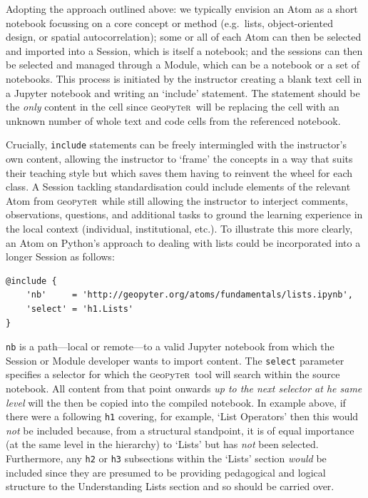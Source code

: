 \documentclass[letter, 11pt,titlepage]{article}
\newcommand{\gp}{\textsc{g}eo\textsc{p}y\textsc{t}e\textsc{r}~\/}
\newcommand{\eg}{e.g.~\/}
\begin{document}
Adopting the approach outlined above: we typically envision an Atom as a short notebook focussing on a core concept or method (\eg lists, object-oriented design, or spatial autocorrelation); some or all of each Atom can then be selected and imported into a Session, which is itself a notebook; and the sessions can then be selected and managed through a Module, which can be a notebook or a set of notebooks. This process is initiated by the instructor creating a blank text cell in a Jupyter notebook and writing an `include' statement. The statement should be the \textit{only} content in the cell since \gp will be replacing the cell with an unknown number of whole text and code cells from the referenced notebook.

Crucially, \texttt{include} statements can be freely intermingled with the instructor's own content, allowing the instructor to `frame' the concepts in a way that suits their teaching style but which saves them having to reinvent the wheel for each class. A Session tackling standardisation could include elements of the relevant Atom from \gp while still allowing the instructor to interject comments, observations, questions, and additional tasks to ground the learning experience in the local context (individual, institutional, etc.). To illustrate this more clearly, an Atom on Python's approach to dealing with lists could be incorporated into a longer Session as follows:

\begin{Verbatim}[fontsize=\small]
@include {
    'nb'     = 'http://geopyter.org/atoms/fundamentals/lists.ipynb',
    'select' = 'h1.Lists'
}
\end{Verbatim}

\texttt{nb} is a path---local or remote---to a valid Jupyter notebook from which the Session or Module developer wants to import content. The \texttt{select} parameter specifies a selector for which the \gp tool will search within the source notebook. All content from that point onwards \emph{up to the next selector at he same level} will the then be copied into the compiled notebook. In example above, if there were a following \texttt{h1} covering, for example, `List Operators' then this would \emph{not} be included because, from a structural standpoint, it is of equal importance (at the same level in the hierarchy) to `Lists' but has \emph{not} been selected. Furthermore, any \texttt{h2} or \texttt{h3} subsections within the `Lists' section \textit{would} be included since they are presumed to be providing pedagogical and logical structure to the Understanding Lists section and so should be carried over.
\end{document}
